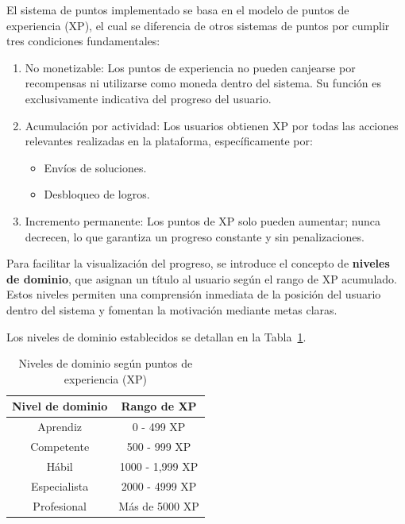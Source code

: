 El sistema de puntos implementado se basa en el modelo de puntos de experiencia (XP), el cual se diferencia de otros sistemas de puntos por cumplir tres condiciones fundamentales:

\begin{enumerate}
    \item No monetizable: Los puntos de experiencia no pueden canjearse por recompensas ni utilizarse como moneda dentro del sistema. Su función es exclusivamente indicativa del progreso del usuario.
    \item Acumulación por actividad: Los usuarios obtienen XP por todas las acciones relevantes realizadas en la plataforma, específicamente por:
    \begin{itemize}
        \item Envíos de soluciones.
        \item Desbloqueo de logros.
    \end{itemize}
    \item Incremento permanente: Los puntos de XP solo pueden aumentar; nunca decrecen, lo que garantiza un progreso constante y sin penalizaciones.
\end{enumerate}

Para facilitar la visualización del progreso, se introduce el concepto de \textbf{niveles de dominio}, que asignan un título al usuario según el rango de XP acumulado. Estos niveles permiten una comprensión inmediata de la posición del usuario dentro del sistema y fomentan la motivación mediante metas claras.

Los niveles de dominio establecidos se detallan en la Tabla~\ref{tab:niveles_dominio}.

\begin{table}[h]
\centering
\small
\begin{tabular}{cc}
\toprule
\textbf{Nivel de dominio} & \textbf{Rango de XP} \\
\midrule
Aprendiz     & 0 - 499 XP \\
\midrule
Competente   & 500 - 999 XP \\
\midrule
Hábil        & 1000 - 1,999 XP \\
\midrule
Especialista & 2000 - 4999 XP \\
\midrule
Profesional      & Más de 5000 XP \\
\bottomrule
\end{tabular}
\caption{Niveles de dominio según puntos de experiencia (XP)}
\label{tab:niveles_dominio}
\end{table}

